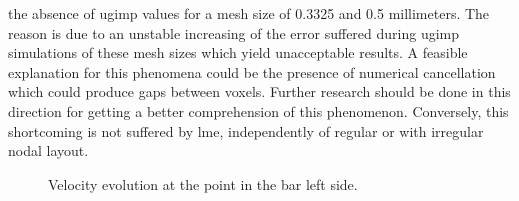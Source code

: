 \documentclass[preprint,12pt,a4paper]{elsarticle}
\begin{document}
the absence of \acrshort{ugimp} values for a mesh size of 0.3325 and 0.5
millimeters. The reason is due to an unstable
increasing of the error suffered during \acrshort{ugimp} simulations of these mesh sizes which yield unacceptable results. A feasible
explanation for this phenomena could be the presence of numerical
cancellation which could produce gaps between voxels. Further research
should be done in this direction for getting a better comprehension of
this phenomenon. Conversely, this shortcoming is not suffered by \acrshort{lme}, independently of regular or with irregular nodal layout.
\begin{figure}
  \centering
  \caption{Velocity evolution at the point in the bar left side.}
  \label{fig:Dyka-uGIMP-LME}
\end{figure}
\end{document}
